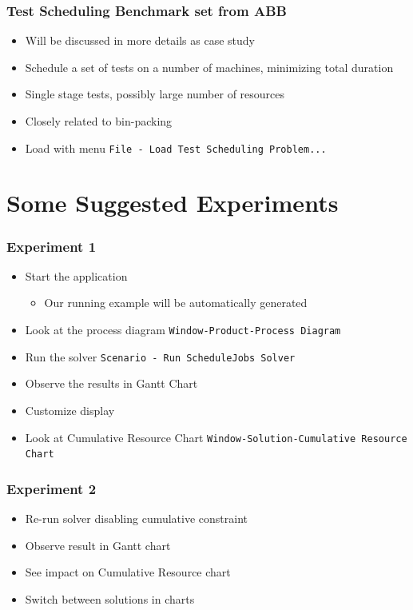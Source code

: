 \begin{frame}
\frametitle{Test Scheduling Benchmark set from ABB}
\begin{itemize}
\item Will be discussed in more details as case study
\item Schedule a set of tests on a number of machines, minimizing total duration
\item Single stage tests, possibly large number of resources
\item Closely related to bin-packing
\item Load with menu \texttt{File - Load Test Scheduling Problem...}

\end{itemize}
\end{frame}

\section{Some Suggested Experiments}

\begin{frame}
\frametitle{Experiment 1}
\begin{itemize}
\item Start the application
\begin{itemize}
\item Our running example will be automatically generated
\end{itemize}
\item Look at the process diagram \texttt{Window-Product-Process Diagram}
\item Run the solver \texttt{Scenario - Run ScheduleJobs Solver}
\item Observe the results in Gantt Chart
\item Customize display
\item Look at Cumulative Resource Chart \texttt{Window-Solution-Cumulative Resource Chart}

\end{itemize}
\end{frame}

\begin{frame}
\frametitle{Experiment 2}
\begin{itemize}
\item Re-run solver disabling cumulative constraint
\item Observe result in Gantt chart
\item See impact on Cumulative Resource chart
\item Switch between solutions in charts
\end{itemize}
\end{frame}


